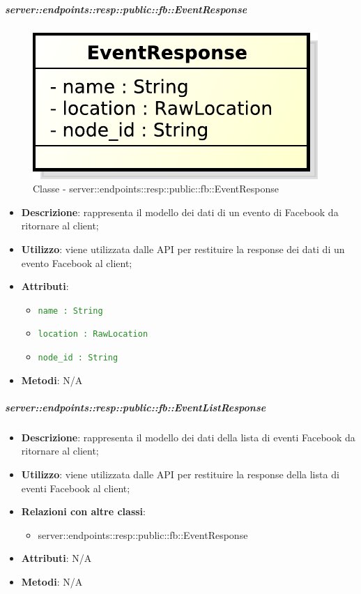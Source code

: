     \subparagraph{server::endpoints::resp::public::fb::EventResponse} %
    \label{subp:bdsm_app_server_endpoints_resp_public_fb_eventresponse}
	\begin{figure}[!htbp]
		\centering
		\centerline{\includegraphics[scale=0.6]{./images/server/classes/endpoints/fb/event_response.pdf}}
		\caption{Classe - server::endpoints::resp::public::fb::EventResponse}
	\end{figure}
    \begin{itemize}
      \item \textbf{Descrizione}: rappresenta il modello dei dati di un evento di Facebook da ritornare al client;
      \item \textbf{Utilizzo}: viene utilizzata dalle API per restituire la response dei dati di un evento Facebook al client;

	  \item \textbf{Attributi}:
	  	\begin{itemize}
	  		\item \textcolor{forestgreen}{\texttt{name : String}}
	  		\item \textcolor{forestgreen}{\texttt{location : RawLocation}}
	  		\item \textcolor{forestgreen}{\texttt{node\_id : String}}
	  	\end{itemize}
	  \item \textbf{Metodi}: N/A
      \end{itemize}

    \subparagraph{server::endpoints::resp::public::fb::EventListResponse} %
    \label{subp:bdsm_app_server_endpoints_resp_public_fb_eventlistresponse}
    \begin{itemize}
      \item \textbf{Descrizione}: rappresenta il modello dei dati della lista di eventi Facebook da ritornare al client;
      \item \textbf{Utilizzo}: viene utilizzata dalle API per restituire la response della lista di eventi Facebook al client;
      \item \textbf{Relazioni con altre classi}:
        \begin{itemize}
          \item server::endpoints::resp::public::fb::EventResponse
        \end{itemize}
	  \item \textbf{Attributi}: N/A
	  \item \textbf{Metodi}: N/A
      \end{itemize}

